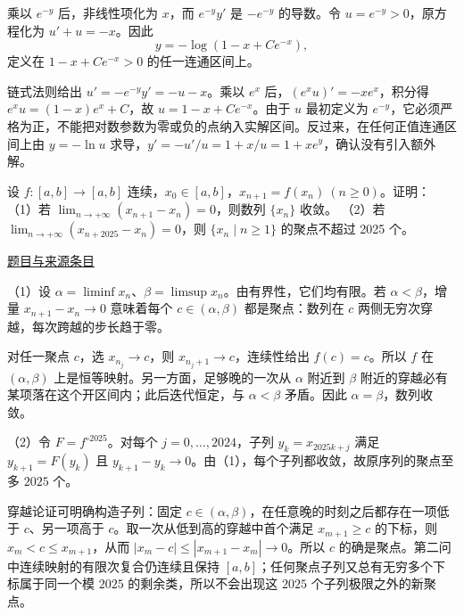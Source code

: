 \documentclass[12pt,fontset=fandol]{ctexart}
\begin{document}
\begin{solve}\label{ans:fin16-high:4}

乘以 $e^{-y}$ 后，非线性项化为 $x$，而 $e^{-y}y'$ 是 $-e^{-y}$ 的导数。令 $u=e^{-y}>0$，原方程化为 $u'+u=-x$。因此
\[
\boxed{y=-\log(1-x+Ce^{-x})},
\]
定义在 $1-x+Ce^{-x}>0$ 的任一连通区间上。

链式法则给出 $u'=-e^{-y}y'=-u-x$。乘以 $e^x$ 后，$(e^xu)'=-xe^x$，积分得 $e^xu=(1-x)e^x+C$，故 $u=1-x+Ce^{-x}$。由于 $u$ 最初定义为 $e^{-y}$，它必须严格为正，不能把对数参数为零或负的点纳入实解区间。反过来，在任何正值连通区间上由 $y=-\ln u$ 求导，$y'=-u'/u=1+x/u=1+xe^y$，确认没有引入额外解。

\end{solve}

\begin{example}[来源序号7]\label{ex:fin16-high:7}\label{pr:fin16-high:7}

设 $f : [a,b] \rightarrow [a,b]$ 连续，$x_0 \in [a,b]$，$x_{n+1} = f(x_n)\ (n \geq 0)$。证明：
（1）若 $\lim_{n \rightarrow +\infty} (x_{n+1} - x_n) = 0$，则数列 $\{x_n\}$ 收敛。
（2）若 $\lim_{n \rightarrow +\infty} (x_{n+2025} - x_n) = 0$，则 $\{x_n \mid n \geq 1\}$ 的聚点不超过 2025 个。

\par\href{https://github.com/lzxcr/cmc-mathematics/blob/64916fa1fdbc3e444a652eca204d5669058ee321/src/problems/finals/16/07.md}{题目与来源条目}

\end{example}

\begin{solve}\label{ans:fin16-high:7}

（1）设 $\alpha=\liminf x_n$、$\beta=\limsup x_n$。由有界性，它们均有限。若 $\alpha<\beta$，增量 $x_{n+1}-x_n\to0$ 意味着每个 $c\in(\alpha,\beta)$ 都是聚点：数列在 $c$ 两侧无穷次穿越，每次跨越的步长趋于零。

对任一聚点 $c$，选 $x_{n_j}\to c$，则 $x_{n_j+1}\to c$，连续性给出 $f(c)=c$。所以 $f$ 在 $(\alpha,\beta)$ 上是恒等映射。另一方面，足够晚的一次从 $\alpha$ 附近到 $\beta$ 附近的穿越必有某项落在这个开区间内；此后迭代恒定，与 $\alpha<\beta$ 矛盾。因此 $\alpha=\beta$，数列收敛。

（2）令 $F=f^{\circ2025}$。对每个 $j=0,\dots,2024$，子列 $y_k=x_{2025k+j}$ 满足 $y_{k+1}=F(y_k)$ 且 $y_{k+1}-y_k\to0$。由（1），每个子列都收敛，故原序列的聚点至多 $2025$ 个。

穿越论证可明确构造子列：固定 $c\in(\alpha,\beta)$，在任意晚的时刻之后都存在一项低于 $c$、另一项高于 $c$。取一次从低到高的穿越中首个满足 $x_{m+1}\ge c$ 的下标，则 $x_m<c\le x_{m+1}$，从而 $|x_m-c|\le|x_{m+1}-x_m|\to0$。所以 $c$ 的确是聚点。第二问中连续映射的有限次复合仍连续且保持 $[a,b]$；任何聚点子列又总有无穷多个下标属于同一个模 $2025$ 的剩余类，所以不会出现这 $2025$ 个子列极限之外的新聚点。

\end{solve}
\end{document}
